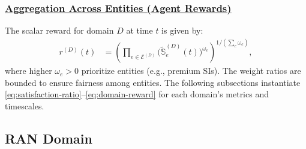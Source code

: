 \documentclass[12pt,lettersize,journal,onecolumn]{IEEEtran}
\begin{document}
\subsubsection*{\underline{Aggregation Across Entities (Agent Rewards)}} 
 
The scalar reward for domain $D$ at time $t$ is given by:
\begin{align}
r^{(D)}(t)
&=
\left(
\prod_{e\in\mathcal{E}^{(D)}}
\bigl(\tilde{\mathbb{S}}^{(D)}_{e}(t)\bigr)^{\omega_e}
\right)^{1/(\sum_{e} \omega_e)},
\label{eq:domain-reward}
\end{align}
where higher $\omega_e>0$ prioritize entities (e.g., premium SIs). The weight ratios are bounded to ensure fairness among entities. The following subsections instantiate \eqref{eq:satisfaction-ratio}--\eqref{eq:domain-reward} for each domain’s metrics and timescales.


\subsection{RAN Domain} \label{ran-domain-section}
\end{document}

